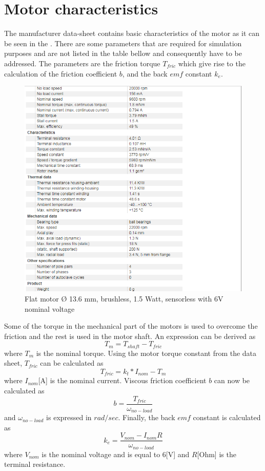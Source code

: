 \chapter{Motor characteristics}\label{chap: B}
%
The manufacturer data-sheet contains basic characteristics of the motor as it can be seen in the . There are some parameters that are required for simulation purposes and are not listed in the table bellow and consequently have to be addressed. The parameters are the friction torque $T_{fric}$ which give rise to the calculation of the friction coefficient $b$, and the back $emf$ constant $k_{e}$.     
%
\begin{figure}[H]
	\centering
	\includegraphics[width=0.7\linewidth]{figures/motorchar}
	\caption{ Flat motor $Ø$ 13.6 mm, brushless, 1.5 Watt, sensorless with 6V nominal voltage}
	\label{fig:323}
\end{figure}
%
%
Some of the torque in the mechanical part of the motors is used to overcome the friction and the rest is used in the motor shaft. An expression can be derived as
 \begin{equation*}
 T_{m} = T_{shaft} - T_{fric}
 \end{equation*}
  where $T_{m}$ is the nominal torque. Using the motor torque constant from the data sheet, $T_{fric}$ can be calculated as 
 \begin{equation*}
 T_{fric}	= k_{t}*I_{nom} - T_{m} 
 \end{equation*}    
where $I_{nom} $[A] is the nominal current. Viscous friction coefficient $b$ can now be calculated as
\begin{equation*}
	b	= \frac{T_{fric} }{\omega_{no-load}}
\end{equation*}
and $\omega_{no-load}$ is expressed in $rad/sec$. Finally, the back $emf$ constant is calculated as
\begin{equation*}
	k_{e}	= \frac{V_{nom} - I_{nom}R}{\omega_{no-load}}
\end{equation*}
where $V_{nom}$ is the nominal voltage and is equal to 6[V] and  $R$[Ohm] is the terminal resistance. 